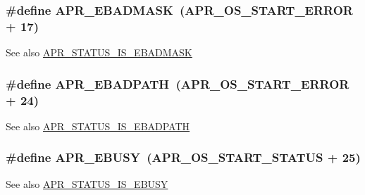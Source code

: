 \subsubsection[{\texorpdfstring{A\+P\+R\+\_\+\+E\+B\+A\+D\+M\+A\+SK}{APR_EBADMASK}}]{\setlength{\rightskip}{0pt plus 5cm}\#define A\+P\+R\+\_\+\+E\+B\+A\+D\+M\+A\+SK~({\bf A\+P\+R\+\_\+\+O\+S\+\_\+\+S\+T\+A\+R\+T\+\_\+\+E\+R\+R\+OR} + 17)}\hypertarget{group___a_p_r___error_ga5249b5edc27466f6b60b3dfa1541ba31}{}\label{group___a_p_r___error_ga5249b5edc27466f6b60b3dfa1541ba31}
\begin{DoxySeeAlso}{See also}
\hyperlink{group___a_p_r___s_t_a_t_u_s___i_s_gacd72b53b964f32da9d293ae275aac1c0}{A\+P\+R\+\_\+\+S\+T\+A\+T\+U\+S\+\_\+\+I\+S\+\_\+\+E\+B\+A\+D\+M\+A\+SK} 
\end{DoxySeeAlso}
\subsubsection[{\texorpdfstring{A\+P\+R\+\_\+\+E\+B\+A\+D\+P\+A\+TH}{APR_EBADPATH}}]{\setlength{\rightskip}{0pt plus 5cm}\#define A\+P\+R\+\_\+\+E\+B\+A\+D\+P\+A\+TH~({\bf A\+P\+R\+\_\+\+O\+S\+\_\+\+S\+T\+A\+R\+T\+\_\+\+E\+R\+R\+OR} + 24)}\hypertarget{group___a_p_r___error_ga1731292eb3e3cdc801d3bf0b09cd8da7}{}\label{group___a_p_r___error_ga1731292eb3e3cdc801d3bf0b09cd8da7}
\begin{DoxySeeAlso}{See also}
\hyperlink{group___a_p_r___s_t_a_t_u_s___i_s_ga7f8ed6edeab66df4317176d809513032}{A\+P\+R\+\_\+\+S\+T\+A\+T\+U\+S\+\_\+\+I\+S\+\_\+\+E\+B\+A\+D\+P\+A\+TH} 
\end{DoxySeeAlso}
\subsubsection[{\texorpdfstring{A\+P\+R\+\_\+\+E\+B\+U\+SY}{APR_EBUSY}}]{\setlength{\rightskip}{0pt plus 5cm}\#define A\+P\+R\+\_\+\+E\+B\+U\+SY~({\bf A\+P\+R\+\_\+\+O\+S\+\_\+\+S\+T\+A\+R\+T\+\_\+\+S\+T\+A\+T\+US} + 25)}\hypertarget{group___a_p_r___error_gab6e5bc99dbace4a91d8d0adcbd8fd66b}{}\label{group___a_p_r___error_gab6e5bc99dbace4a91d8d0adcbd8fd66b}
\begin{DoxySeeAlso}{See also}
\hyperlink{group___a_p_r___s_t_a_t_u_s___i_s_gad9da6d9a8f37e1e296b3fc6e67e610e1}{A\+P\+R\+\_\+\+S\+T\+A\+T\+U\+S\+\_\+\+I\+S\+\_\+\+E\+B\+U\+SY} 
\end{DoxySeeAlso}
